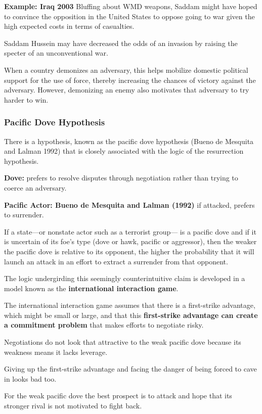 \textbf{Example: Iraq 2003}
Bluffing about WMD weapons, Saddam might have hoped to convince the opposition in the United States to oppose going to war given the high expected costs in terms of casualties.

Saddam Hussein may have decreased the odds of an invasion by raising the specter of an unconventional war.

When a country demonizes an adversary, this helps mobilize domestic political support for the use of force, thereby increasing the chances of victory against the adversary. However, demonizing an enemy also motivates that adversary to try harder to win.

\subsubsection{Pacific Dove Hypothesis}
There is a hypothesis, known as the pacific dove hypothesis (Bueno de Mesquita and Lalman 1992) that is closely associated with the logic of the resurrection hypothesis.

\textbf{Dove:} prefers to resolve disputes through negotiation rather than trying to coerce an adversary.

\textbf{Pacific Actor: Bueno de Mesquita and Lalman (1992)} if attacked, prefers to surrender.

If a state—or nonstate actor such as a terrorist group— is a pacific dove and if it is uncertain of its foe’s type (dove or hawk, pacific or aggressor), then the weaker the pacific dove is relative to its opponent, the higher the probability that it will launch an attack in an effort to extract a surrender from that opponent.

The logic undergirding this seemingly counterintuitive claim is developed in a model known as the \textbf{international interaction game}.

The international interaction game assumes that there is a first-strike advantage, which might be small or large, and that this \textbf{first-strike advantage can create a commitment problem} that makes efforts to negotiate risky.

Negotiations do not look that attractive to the weak pacific dove because its weakness means it lacks leverage.

Giving up the first-strike advantage and facing the danger of being forced to cave in looks bad too.

For the weak pacific dove the best prospect is to attack and hope that its stronger rival is not motivated to fight back.

